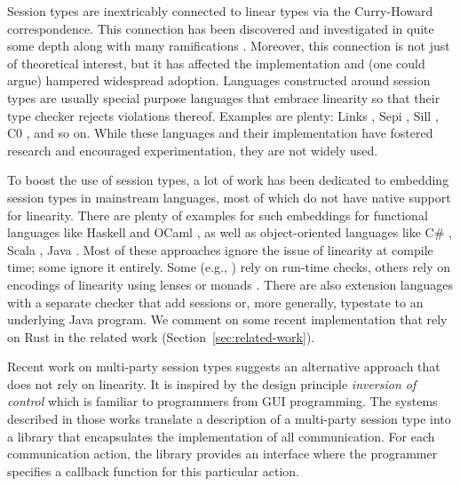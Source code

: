 \documentclass[acmsmall,screen,anonymous,review]{acmart}
\begin{document}
Session types are inextricably connected to linear types via the
Curry-Howard correspondence. This connection has been discovered and
investigated in quite some depth
\cite{DBLP:conf/concur/CairesP10,DBLP:journals/mscs/CairesPT16,DBLP:journals/jfp/Wadler14}
along with many ramifications \cite{DBLP:journals/pacmpl/BalzerP17}. 
Moreover, this connection is not just of theoretical interest, but it
has affected the implementation and (one could argue) hampered widespread
adoption. Languages constructed around session types are usually
special purpose languages that embrace linearity so that their type
checker rejects violations thereof. Examples are plenty: Links \cite{lindley17:_light_funct_session_types},
Sepi \cite{DBLP:conf/sefm/FrancoV13,DBLP:conf/sfm/Vasconcelos09}, Sill
\cite{DBLP:conf/esop/ToninhoCP13}, C0
\cite{DBLP:journals/corr/WillseyPP17}, and so on.
While these languages and their implementation have fostered research
and encouraged experimentation, they are not widely used.

To boost the use of session types, 
a lot of work has been dedicated to embedding session types in mainstream
languages, most of which do not have native support for linearity. 
There are plenty of examples for such embeddings for functional languages
like
Haskell \cite{DBLP:conf/padl/NeubauerT04,SackmanE08,
  DBLP:conf/haskell/PucellaT08} and
OCaml \cite{DBLP:journals/jfp/Padovani17,DBLP:journals/scp/ImaiYY19},
as well as object-oriented languages like
C\# \cite{DBLP:journals/corr/abs-2004-01325},
Scala \cite{DBLP:conf/ecoop/ScalasY16},
Java \cite{DBLP:conf/ecoop/HuYH08}. Most of these approaches ignore
the issue of linearity at compile time; some ignore it entirely. Some (e.g., \cite{DBLP:journals/jfp/Padovani17}) rely
on run-time checks, others rely on encodings of linearity using lenses
\cite{DBLP:journals/jip/ImaiG19} or monads \cite{DBLP:conf/haskell/PucellaT08}.
There are also extension languages with a separate checker that add
sessions \cite{DBLP:conf/coordination/NgYPHK11} or, more generally,
typestate \cite{DBLP:journals/scp/KouzapasDPG18} to an underlying Java program.
We comment on some recent implementation that rely on Rust in the
related work (Section~\ref{sec:related-work}).

Recent work on multi-party session types
\cite{DBLP:conf/cc/Miu0Y021,DBLP:journals/pacmpl/00020HNY20} suggests
an alternative approach that does not rely on linearity. It is
inspired by the design principle \emph{inversion of control} which is
familiar to programmers from GUI programming. The systems described in
those works translate a description of a multi-party session type into
a library that encapsulates the implementation of all
communication. For each communication action, the library provides an
interface where the programmer specifies a callback function for this
particular action.
\end{document}
